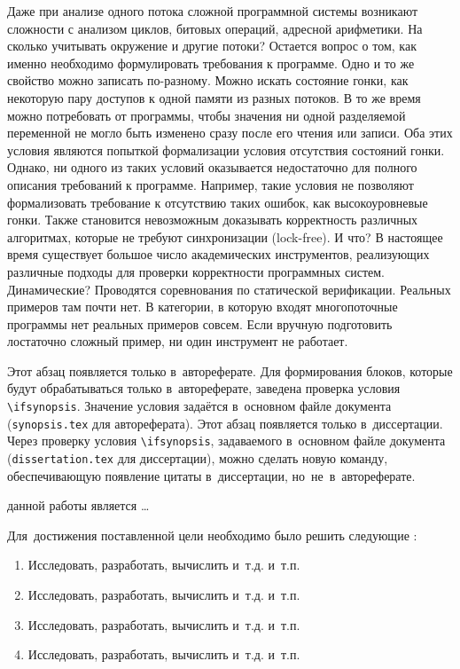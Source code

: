 Даже при анализе одного потока сложной программной системы возникают сложности с анализом циклов, битовых операций, адресной арифметики. 
На сколько учитывать окружение и другие потоки?
Остается вопрос о том, как именно необходимо формулировать требования к программе. Одно и то же свойство можно записать по-разному. Можно искать состояние гонки, как некоторую пару доступов к одной памяти из разных потоков. В то же время можно потребовать от программы, чтобы значения ни одной разделяемой переменной не могло быть изменено сразу после его чтения или записи. Оба этих условия являются попыткой формализации условия отсутствия состояний гонки. Однако, ни одного из таких условий оказывается недостаточно для полного описания требований к программе. Например, такие условия не позволяют формализовать требование к отсутствию таких ошибок, как высокоуровневые гонки. Также становится невозможным доказывать корректность различных алгоритмах, которые не требуют синхронизации (lock-free). И что?
В настоящее время существует большое число академических инструментов, реализующих различные подходы для проверки корректности программных систем. Динамические? Проводятся соревнования по статической верификации. Реальных примеров там почти нет. В категории, в которую входят многопоточные программы нет реальных примеров совсем. Если вручную подготовить лостаточно сложный пример, ни один инструмент не работает. 

\ifsynopsis
Этот абзац появляется только в~автореферате.
Для формирования блоков, которые будут обрабатываться только в~автореферате,
заведена проверка условия \verb!\!\verb!ifsynopsis!.
Значение условия задаётся в~основном файле документа (\verb!synopsis.tex! для
автореферата).
\else
Этот абзац появляется только в~диссертации.
Через проверку условия \verb!\!\verb!ifsynopsis!, задаваемого в~основном файле
документа (\verb!dissertation.tex! для диссертации), можно сделать новую
команду, обеспечивающую появление цитаты в~диссертации, но~не~в~автореферате.
\fi


{\aim} данной работы является \ldots

Для~достижения поставленной цели необходимо было решить следующие {\tasks}:
\begin{enumerate}
  \item Исследовать, разработать, вычислить и~т.\:д. и~т.\:п.
  \item Исследовать, разработать, вычислить и~т.\:д. и~т.\:п.
  \item Исследовать, разработать, вычислить и~т.\:д. и~т.\:п.
  \item Исследовать, разработать, вычислить и~т.\:д. и~т.\:п.
\end{enumerate}


